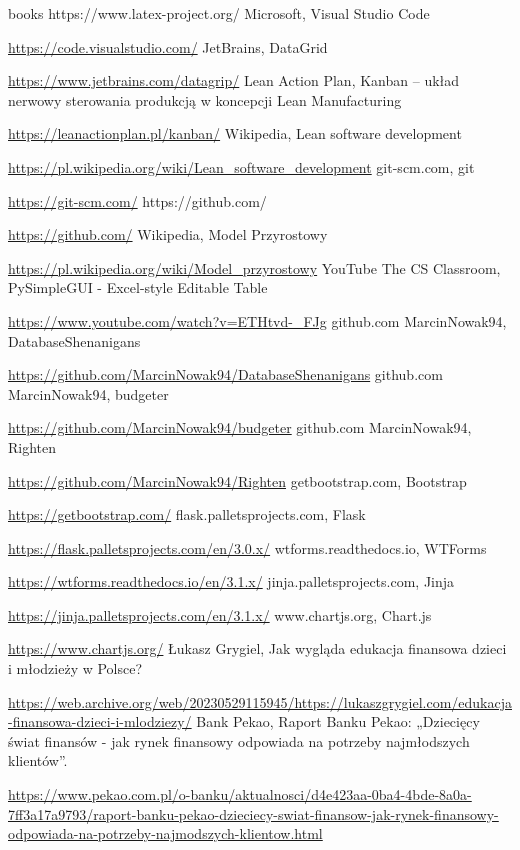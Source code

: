\documentclass[a4paper,10pt, twoside]{report}
\begin{document}
\begin{thebibliography} {books}
{        https://www.latex-project.org/}
     Microsoft, Visual Studio Code \raggedright\url{
        https://code.visualstudio.com/}
     JetBrains, DataGrid \raggedright\url{
        https://www.jetbrains.com/datagrip/}
     Lean Action Plan, Kanban – układ nerwowy sterowania produkcją w koncepcji Lean Manufacturing \raggedright\url{
        https://leanactionplan.pl/kanban/}
     Wikipedia, Lean software development \raggedright\url{
        https://pl.wikipedia.org/wiki/Lean_software_development}
     git-scm.com, git \raggedright\url{
        https://git-scm.com/}
     https://github.com/ \raggedright\url{
        https://github.com/}
     Wikipedia, Model Przyrostowy \raggedright\url{
        https://pl.wikipedia.org/wiki/Model_przyrostowy}
     YouTube The CS Classroom, PySimpleGUI - Excel-style Editable Table \raggedright\url{
        https://www.youtube.com/watch?v=ETHtvd-_FJg}
     github.com MarcinNowak94, DatabaseShenanigans \raggedright\url{
        https://github.com/MarcinNowak94/DatabaseShenanigans}
     github.com MarcinNowak94, budgeter \raggedright\url{
        https://github.com/MarcinNowak94/budgeter}
     github.com MarcinNowak94, Righten \raggedright\url{
        https://github.com/MarcinNowak94/Righten}
     getbootstrap.com, Bootstrap \raggedright\url{
        https://getbootstrap.com/}
     flask.palletsprojects.com, Flask \raggedright\url{
        https://flask.palletsprojects.com/en/3.0.x/}
     wtforms.readthedocs.io, WTForms \raggedright\url{
        https://wtforms.readthedocs.io/en/3.1.x/}
     jinja.palletsprojects.com, Jinja \raggedright\url{
        https://jinja.palletsprojects.com/en/3.1.x/}
     www.chartjs.org, Chart.js \raggedright\url{
        https://www.chartjs.org/}
     Łukasz Grygiel, Jak wygląda edukacja finansowa dzieci i młodzieży w Polsce? \raggedright\url{
        https://web.archive.org/web/20230529115945/https://lukaszgrygiel.com/edukacja-finansowa-dzieci-i-mlodziezy/}
     Bank Pekao, Raport Banku Pekao: „Dziecięcy świat finansów - jak rynek finansowy odpowiada na potrzeby najmłodszych klientów”. \raggedright\url{
        https://www.pekao.com.pl/o-banku/aktualnosci/d4e423aa-0ba4-4bde-8a0a-7ff3a17a9793/raport-banku-pekao-dzieciecy-swiat-finansow-jak-rynek-finansowy-odpowiada-na-potrzeby-najmodszych-klientow.html}

\end{thebibliography}
\end{document}
